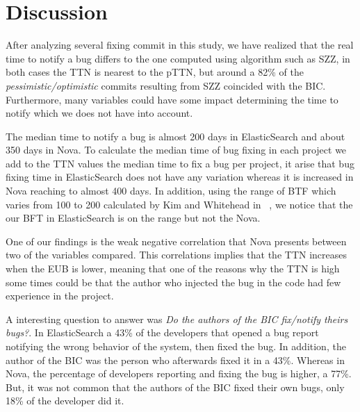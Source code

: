 \documentclass[10pt, conference]{IEEEtran}
\begin{document}
\section{Discussion}
\label{sec:discussion}

After analyzing several fixing commit in this study, we have realized that the real time to notify a bug differs to the one computed using algorithm such as SZZ, in both cases the TTN is nearest to the pTTN, but around a 82\% of the \emph{pessimistic/optimistic} commits resulting from SZZ coincided with the BIC. Furthermore, many variables could have some impact determining the time to notify which we does not have into account.

The median time to notify a bug is almost 200 days in ElasticSearch and about 350 days in Nova. To calculate the median time of bug fixing in each project we add to the TTN values the median time to fix a bug per project, it arise that bug fixing time in ElasticSearch does not have any variation whereas it is increased in Nova reaching to almost 400 days. In addition, using the range of BTF which varies from 100 to 200 calculated by Kim and Whitehead in ~\cite{kim2006long}, we notice that the our BFT in ElasticSearch is on the range but not the Nova. 


\vspace{0.2cm}
\vspace{0.1cm}

One of our findings is the weak negative correlation that Nova presents between two of the variables compared. This correlations implies that the TTN increases when the EUB is lower, meaning that one of the reasons why the TTN is high some times could be that the author who injected the bug in the code had few experience in the project.

\vspace{0.2cm}
\vspace{0.1cm}

A interesting question to answer was \emph{Do the authors of the BIC fix/notify theirs bugs?}. In ElasticSearch a 43\% of the developers
 that opened a bug report notifying the wrong behavior of the system, then fixed the bug. In addition, the author of the BIC was the person who afterwards fixed it in a 43\%. Whereas in Nova, the percentage of developers reporting and fixing the bug is higher, a 77\%. But, it was not common that the authors of the BIC fixed their own bugs, only 18\% of the developer did it. 
 
\end{document}
